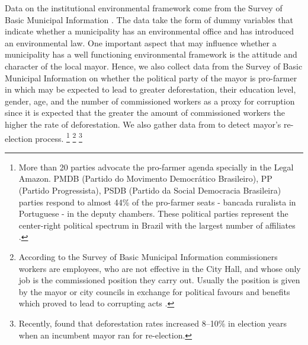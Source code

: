 Data on the institutional environmental framework come from the Survey of Basic Municipal Information \citep{IBGE1}. The data take the form of dummy variables that indicate whether a municipality has an environmental office and has introduced an environmental law. One important aspect that may influence whether a municipality has a well functioning environmental framework is the attitude and character of the local mayor.  Hence, we also collect data from the Survey of Basic Municipal Information on whether the political party of the mayor is pro-farmer in which may be expected to lead to greater deforestation, their education level, gender, age, and  the number of commissioned workers as a proxy for corruption since it is expected that the greater the amount of commissioned workers the higher the rate of deforestation. We also gather data from \citet{TSE} to detect mayor's re-election process. \footnote{More than 20 parties advocate the pro-farmer agenda specially in the Legal Amazon. PMDB (Partido do Movimento Democrático Brasileiro), PP (Partido Progressista), PSDB (Partido da Social Democracia Brasileira) parties respond to almost 44\% of the pro-farmer seats - bancada ruralista in Portuguese - in the deputy chambers. These political parties represent the center-right political spectrum in Brazil with the largest number of affiliates \citep{FPA}.} \footnote{According to the Survey of Basic Municipal Information commissioners workers are employees, who are not effective in the City Hall, and whose only job is the commissioned position they carry out. Usually the position is given by the mayor or city councils in exchange for political favours and benefits which proved to lead to corrupting acts \citep{BUGARIN}.} \footnote{Recently, \citet{pailler_2018} found that deforestation  rates  increased  8–10\%  in  election  years  when  an  incumbent  mayor  ran  for  re-election.}


